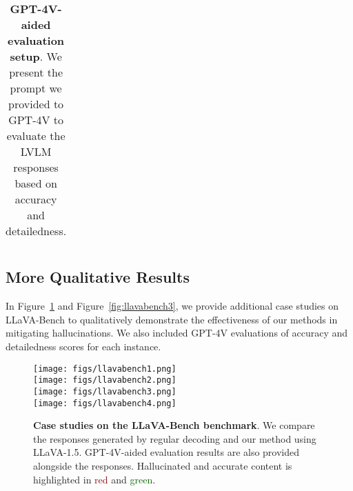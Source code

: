 \begin{table*}[t]
\begin{minipage}{0.95\textwidth}
\begin{tcolorbox}
\begin{tabular}{p{}}
\bottomrule
    \end{tabular}
\end{tcolorbox}
\caption{\textbf{GPT-4V-aided evaluation setup}. We present the prompt we provided to GPT-4V to evaluate the LVLM responses based on accuracy and detailedness.}
\label{tab:prompt_evaluation}
\end{minipage}
\end{table*}


\subsection{More Qualitative Results}
In Figure~\ref{fig:llavabench2} and Figure~\ref{fig:llavabench3}, we provide additional case studies on LLaVA-Bench to qualitatively demonstrate the effectiveness of our methods in mitigating hallucinations. We also included GPT-4V evaluations of accuracy and detailedness scores for each instance.



\begin{figure}[t]

\texttt{[image: figs/llavabench1.png]}
\\[10pt]
\texttt{[image: figs/llavabench2.png]}
\\[10pt]
\texttt{[image: figs/llavabench3.png]}
\\[10pt]
\texttt{[image: figs/llavabench4.png]}

\caption{\textbf{Case studies on the LLaVA-Bench benchmark}. We compare the responses generated by regular decoding and our method using LLaVA-1.5. GPT-4V-aided evaluation results are also provided alongside the responses. Hallucinated and accurate content is highlighted in \textcolor{darkred}{red} and \textcolor{darkgreen}{green}.} 

\label{fig:llavabench2}
\end{figure}

